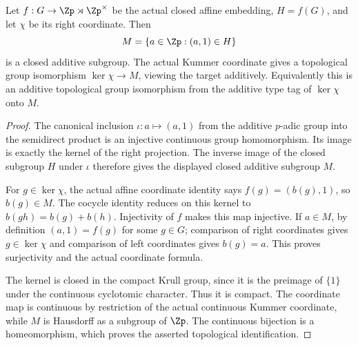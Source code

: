 \begin{lemma}
\label{ft:affine-additive-kernel}
\leanok
Let $f:G\to\Zp\rtimes\Zp^\times$ be the actual closed affine
embedding, $H=f(G)$, and let $\chi$ be its right coordinate. Then
\[
 M=\{a\in\Zp:(a,1)\in H\}
\]
is a closed additive subgroup. The actual Kummer coordinate gives a
topological group isomorphism $\ker\chi\longrightarrow M$, viewing the
target additively. Equivalently this is an additive topological group
isomorphism from the additive type tag of $\ker\chi$ onto $M$.
\end{lemma}
\begin{proof}
The canonical inclusion $\iota:a\mapsto(a,1)$ from the additive
$p$-adic group into the semidirect product is an injective continuous
group homomorphism. Its image is exactly the kernel of the right
projection. The inverse image of the closed subgroup $H$ under $\iota$
therefore gives the displayed closed additive subgroup $M$.

For $g\in\ker\chi$, the actual affine coordinate identity says
$f(g)=(b(g),1)$, so $b(g)\in M$. The cocycle identity reduces on this
kernel to $b(gh)=b(g)+b(h)$. Injectivity of $f$ makes this map
injective. If $a\in M$, by definition $(a,1)=f(g)$ for some $g\in G$;
comparison of right coordinates gives $g\in\ker\chi$ and comparison of
left coordinates gives $b(g)=a$. This proves surjectivity and the
actual coordinate formula.

The kernel is closed in the compact Krull group, since it is the
preimage of $\{1\}$ under the continuous cyclotomic character. Thus it
is compact. The coordinate map is continuous by restriction of the
actual continuous Kummer coordinate, while $M$ is Hausdorff as a
subgroup of $\Zp$. The continuous bijection is a homeomorphism, which
proves the asserted topological identification.
\end{proof}

